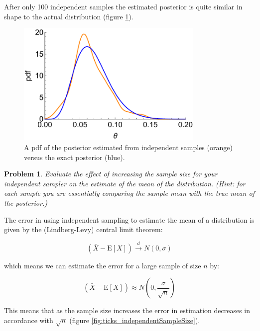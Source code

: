 \documentclass{article}
\newtheorem{problem}{Problem}[section]
\begin{document}
After only 100 independent samples the estimated posterior is quite similar in shape to the actual distribution (figure \ref{fig:ticks_independentVersusActual}).

\begin{figure}[ht]
\centerline{\includegraphics[width=0.8\textwidth]{../figures/prob3_ticks_independentSamples.pdf}}
\caption{A pdf of the posterior estimated from independent samples (orange) versus the exact posterior (blue).}\label{fig:ticks_independentVersusActual}
\end{figure}

\begin{problem}
Evaluate the effect of increasing the sample size for your independent sampler on the estimate of the mean of the distribution. (Hint: for each sample you are essentially comparing the sample mean with the true mean of the posterior.)
\end{problem}

The error in using independent sampling to estimate the mean of a distribution is given by the (Lindberg-Levy) central limit theorem:

\begin{equation}
(\bar{X}-\mathrm{E}[X]) \xrightarrow{d} N(0,\sigma)
\end{equation}

which means we can estimate the error for a large sample of size $n$ by:

\begin{equation}
(\bar{X} - \mathrm{E}[X]) \approx N(0,\frac{\sigma}{\sqrt{n}})
\end{equation}

This means that as the sample size increases the error in estimation decreases in accordance with $\sqrt{n}$ (figure \ref{fig:ticks_independentSampleSize}).
\end{document}
